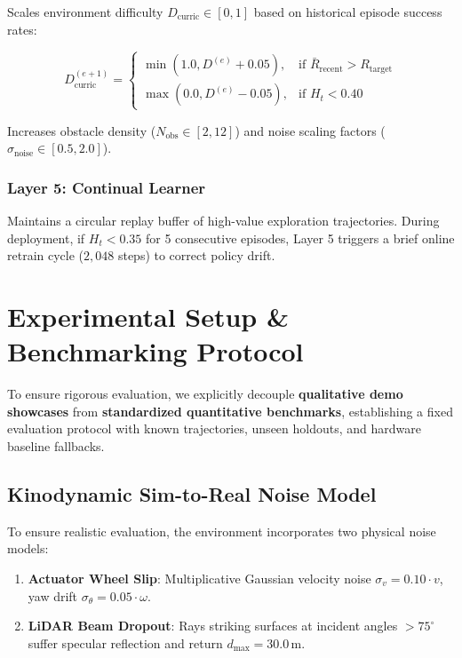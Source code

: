 \documentclass[11pt,a4paper]{article}
\begin{document}
Scales environment difficulty $D_{\text{curric}} \in [0, 1]$ based on historical episode success rates:

\begin{equation}
D_{\text{curric}}^{(e+1)} = \begin{cases} 
\min(1.0, D^{(e)} + 0.05), & \text{if } \bar{R}_{\text{recent}} > R_{\text{target}} \\ 
\max(0.0, D^{(e)} - 0.05), & \text{if } H_t < 0.40 
\end{cases}
\end{equation}

Increases obstacle density ($N_{\text{obs}} \in [2, 12]$) and noise scaling factors ($\sigma_{\text{noise}} \in [0.5, 2.0]$).

\subsubsection{Layer 5: Continual Learner}

Maintains a circular replay buffer of high-value exploration trajectories. During deployment, if $H_t < 0.35$ for 5 consecutive episodes, Layer 5 triggers a brief online retrain cycle ($2,048$ steps) to correct policy drift.

\section{Experimental Setup \& Benchmarking Protocol}

To ensure rigorous evaluation, we explicitly decouple \textbf{qualitative demo showcases} from \textbf{standardized quantitative benchmarks}, establishing a fixed evaluation protocol with known trajectories, unseen holdouts, and hardware baseline fallbacks.

\subsection{Kinodynamic Sim-to-Real Noise Model}

To ensure realistic evaluation, the environment incorporates two physical noise models:

\begin{enumerate}
    \item \textbf{Actuator Wheel Slip}: Multiplicative Gaussian velocity noise $\sigma_v = 0.10 \cdot v$, yaw drift $\sigma_\theta = 0.05 \cdot \omega$.
    \item \textbf{LiDAR Beam Dropout}: Rays striking surfaces at incident angles $>75^\circ$ suffer specular reflection and return $d_{\max} = 30.0\,\text{m}$.
\end{enumerate}
\end{document}
